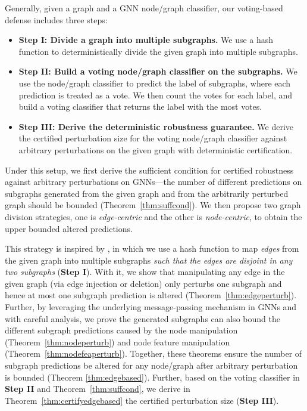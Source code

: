 Generally, given a graph and a GNN node/graph classifier,  our voting-based defense includes three 
steps:  
\begin{itemize}[leftmargin=*]
\vspace{-2mm}
\item  {\bf Step I: Divide a graph into multiple subgraphs.} 
We use a hash function \cite{xia2024gnncert} 
to deterministically divide the given graph into multiple subgraphs. 

\vspace{-2mm}
\item {\bf Step II: Build a voting node/graph classifier on the subgraphs.}
We use the node/graph classifier to predict the label of subgraphs, where each prediction is treated as a vote. We then count the votes for each label, and build a voting 
classifier 
that returns the label with the most votes. 

\vspace{-2mm}
\item {\bf Step III: Derive the deterministic robustness guarantee.} 
We derive the certified perturbation size for the voting node/graph 
classifier against arbitrary perturbations on the given graph with deterministic certification.  
\vspace{-2mm}
\end{itemize}

Under this setup, we first derive the sufficient condition for certified robustness against arbitrary  perturbations on GNNs---the number of different predictions on subgraphs generated from the given graph and from the arbitrarily perturbed graph should be bounded (Theorem~\ref{thm:suffcond}).  
We then propose two graph division strategies, one is \emph{edge-centric} and the other is \emph{node-centric}, to obtain the upper bounded altered predictions. 


 This strategy is inspired by \cite{xia2024gnncert}, in which we use a hash function to 
map \emph{edges} from the given graph into multiple subgraphs \emph{such that the edges  are disjoint in any two subgraphs} ({\bf Step I}). 
With it, we show that manipulating any edge in the given graph (via edge injection or deletion) only perturbs one subgraph and hence at most one subgraph prediction is altered (Theorem~\ref{thm:edgeperturb}). 
Further, by leveraging the underlying message-passing mechanism in GNNs and with careful analysis, we prove the generated subgraphs can also bound the different subgraph predictions caused by the node manipulation (Theorem~\ref{thm:nodeperturb}) and node feature manipulation (Theorem~\ref{thm:nodefeaperturb}). 
Together, these theorems ensure the number of subgraph  predictions be altered for any node/graph 
after arbitrary perturbation is bounded (Theorem \ref{thm:edgebased}). 
Further, based on the voting 
classifier in {\bf Step II} and  Theorem~\ref{thm:suffcond}, we derive in Theorem~\ref{thm:certifyedgebased} the certified perturbation size 
({\bf Step III}).  

